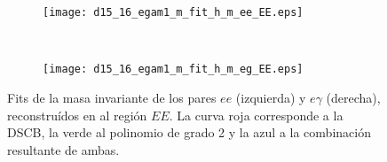 \begin{figure}

	\begin{subfigure}{0.5\textwidth}
		\texttt{[image: d15\_16\_egam1\_m\_fit\_h\_m\_ee\_EE.eps]} 
	\end{subfigure}
	~
	\begin{subfigure}{0.5\textwidth}
		\texttt{[image: d15\_16\_egam1\_m\_fit\_h\_m\_eg\_EE.eps]}
	\end{subfigure}

	
	\caption{Fits de la masa invariante de los pares $ee$ (izquierda) y $e\gamma$ (derecha), reconstruídos en al región $EE$. La curva roja corresponde a la DSCB, la verde al polinomio de grado 2 y la azul a la combinación resultante de ambas.}
\label{fits_EE}
\end{figure}

